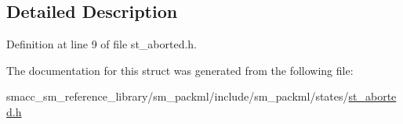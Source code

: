 \subsection{Detailed Description}


Definition at line 9 of file st\+\_\+aborted.\+h.



The documentation for this struct was generated from the following file\+:\begin{DoxyCompactItemize}
\item 
smacc\+\_\+sm\+\_\+reference\+\_\+library/sm\+\_\+packml/include/sm\+\_\+packml/states/\hyperlink{st__aborted_8h}{st\+\_\+aborted.\+h}\end{DoxyCompactItemize}
